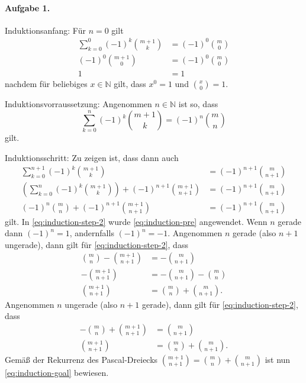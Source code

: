\documentclass{article}
\begin{document}
\paragraph{Aufgabe 1.}

Induktionsanfang: Für $n = 0$ gilt
\begin{align*}
    \sum_{k = 0}^{0} (-1)^k {{m + 1}\choose{k}}
    &=
    (-1)^0 {{m}\choose{0}}
    \\
    (-1)^0 {{m + 1}\choose{0}}
    &=
    (-1)^0 {{m}\choose{0}}
    \\
    1 &= 1
\end{align*}
nachdem für beliebiges $x \in \mathbb{N}$ gilt, dass $x^0 = 1$ und ${{x}\choose{0}} = 1$.

Induktionsvorraussetzung: Angenommen $n \in \mathbb{N}$ ist so, dass
\begin{equation}\label{eq:induction-pre}
    \sum_{k = 0}^{n} (-1)^k {{m + 1}\choose{k}} = (-1)^n {{m}\choose{n}}
\end{equation}
gilt.

Induktionsschritt: Zu zeigen ist, dass dann auch
\begin{align}
    \sum_{k = 0}^{n + 1} (-1)^k {{m + 1}\choose{k}} &= (-1)^{n + 1} {{m}\choose{n + 1}} \label{eq:induction-goal}\\
    \left( \sum_{k = 0}^{n} (-1)^k {{m + 1}\choose{k}} \right) + (-1)^{n + 1} {{m + 1}\choose{n + 1}}
    &=
    (-1)^{n + 1} {{m}\choose{n + 1}} \nonumber \\
    (-1)^n {{m}\choose{n}} + (-1)^{n + 1} {{m + 1}\choose{n + 1}} &= (-1)^{n + 1} {{m}\choose{n + 1}} \label{eq:induction-step-2}
\end{align}
gilt. In \eqref{eq:induction-step-2} wurde \eqref{eq:induction-pre} angewendet. Wenn $n$ gerade dann $(-1)^n = 1$, andernfalls $(-1)^n = -1$. Angenommen $n$ gerade (also $n + 1$ ungerade), dann gilt für \eqref{eq:induction-step-2}, dass
\begin{align*}
    {{m}\choose{n}} - {{m + 1}\choose{n + 1}} &= -{{m}\choose{n + 1}} \\
    -{{m + 1}\choose{n + 1}} &= -{{m}\choose{n + 1}} - {{m}\choose{n}} \\
    {{m + 1}\choose{n + 1}} &= {{m}\choose{n}} + {{m}\choose{n + 1}}.
\end{align*}
Angenommen $n$ ungerade (also $n + 1$ gerade), dann gilt für \eqref{eq:induction-step-2}, dass
\begin{align*}
    -{{m}\choose{n}} + {{m + 1}\choose{n + 1}} &= {{m}\choose{n + 1}} \\
    {{m + 1}\choose{n + 1}} &= {{m}\choose{n}} + {{m}\choose{n + 1}}.
\end{align*}
Gemäß der Rekurrenz des Pascal-Dreiecks ${{m + 1}\choose{n + 1}} = {{m}\choose{n}} + {{m}\choose{n + 1}}$ ist nun \eqref{eq:induction-goal} bewiesen.
\end{document}
